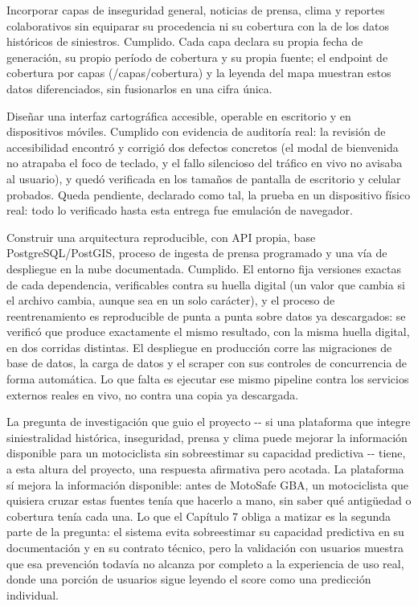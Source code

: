 Incorporar capas de inseguridad general, noticias de prensa, clima y
reportes colaborativos sin equiparar su procedencia ni su cobertura con
la de los datos históricos de siniestros. Cumplido. Cada capa declara su
propia fecha de generación, su propio período de cobertura y su propia
fuente; el endpoint de cobertura por capas (/capas/cobertura) y la
leyenda del mapa muestran estos datos diferenciados, sin fusionarlos en
una cifra única.

Diseñar una interfaz cartográfica accesible, operable en escritorio y en
dispositivos móviles. Cumplido con evidencia de auditoría real: la
revisión de accesibilidad encontró y corrigió dos defectos concretos (el
modal de bienvenida no atrapaba el foco de teclado, y el fallo
silencioso del tráfico en vivo no avisaba al usuario), y quedó
verificada en los tamaños de pantalla de escritorio y celular probados.
Queda pendiente, declarado como tal, la prueba en un dispositivo físico
real: todo lo verificado hasta esta entrega fue emulación de navegador.

Construir una arquitectura reproducible, con API propia, base
PostgreSQL/PostGIS, proceso de ingesta de prensa programado y una vía de
despliegue en la nube documentada. Cumplido. El entorno fija versiones
exactas de cada dependencia, verificables contra su huella digital (un
valor que cambia si el archivo cambia, aunque sea en un solo carácter),
y el proceso de reentrenamiento es reproducible de punta a punta sobre
datos ya descargados: se verificó que produce exactamente el mismo
resultado, con la misma huella digital, en dos corridas distintas. El
despliegue en producción corre las migraciones de base de datos, la
carga de datos y el scraper con sus controles de concurrencia de forma
automática. Lo que falta es ejecutar ese mismo pipeline contra los
servicios externos reales en vivo, no contra una copia ya descargada.

La pregunta de investigación que guio el proyecto -\/- si una plataforma
que integre siniestralidad histórica, inseguridad, prensa y clima puede
mejorar la información disponible para un motociclista sin sobreestimar
su capacidad predictiva -\/- tiene, a esta altura del proyecto, una
respuesta afirmativa pero acotada. La plataforma sí mejora la
información disponible: antes de MotoSafe GBA, un motociclista que
quisiera cruzar estas fuentes tenía que hacerlo a mano, sin saber qué
antigüedad o cobertura tenía cada una. Lo que el Capítulo 7 obliga a
matizar es la segunda parte de la pregunta: el sistema evita
sobreestimar su capacidad predictiva en su documentación y en su
contrato técnico, pero la validación con usuarios muestra que esa
prevención todavía no alcanza por completo a la experiencia de uso real,
donde una porción de usuarios sigue leyendo el score como una predicción
individual.

